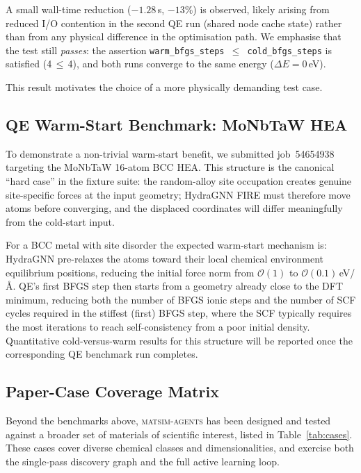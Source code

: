 \documentclass[conference]{IEEEtran}
\def\acs#1{#1}%
\begin{document}
A small wall-time reduction ($-1.28$\,s, $-13\%$) is observed, likely arising
from reduced I/O contention in the second \acs{QE} run (shared node cache state)
rather than from any physical difference in the optimisation path. We emphasise
that the test still \emph{passes}: the assertion \texttt{warm\_bfgs\_steps
$\le$ cold\_bfgs\_steps} is satisfied (4\,$\le$\,4), and both runs converge to
the same energy ($\Delta E = 0$\,eV).

This result motivates the choice of a more physically demanding test case.

\subsection{QE Warm-Start Benchmark: MoNbTaW HEA}
\label{sec:results:warmstart_hea}
To demonstrate a non-trivial warm-start benefit, we submitted job~54654938
targeting the MoNbTaW 16-atom BCC \acs{HEA}. This structure is the canonical
``hard case'' in the fixture suite: the random-alloy site occupation creates
genuine site-specific forces at the input geometry; HydraGNN \acs{FIRE} must
therefore move atoms before converging, and the displaced coordinates will
differ meaningfully from the cold-start input.

For a BCC metal with site disorder the expected warm-start mechanism is:
HydraGNN pre-relaxes the atoms toward their local chemical environment
equilibrium positions, reducing the initial force norm from $\mathcal{O}(1)$
to $\mathcal{O}(0.1)$\,eV/\AA. \acs{QE}'s first \acs{BFGS} step then starts from a
geometry already close to the \acs{DFT} minimum, reducing both the number of \acs{BFGS}
ionic steps and the number of \acs{SCF} cycles required in the stiffest (first)
\acs{BFGS} step, where the \acs{SCF} typically requires the most iterations to reach
self-consistency from a poor initial density. Quantitative cold-versus-warm
results for this structure will be reported once the corresponding \acs{QE}
benchmark run completes.

\subsection{Paper-Case Coverage Matrix}
Beyond the benchmarks above, \textsc{matsim-agents} has been designed and
tested against a broader set of materials of scientific interest, listed in
Table~\ref{tab:cases}. These cases cover diverse chemical classes and
dimensionalities, and exercise both the single-pass discovery graph and the
full active learning loop.
\end{document}
